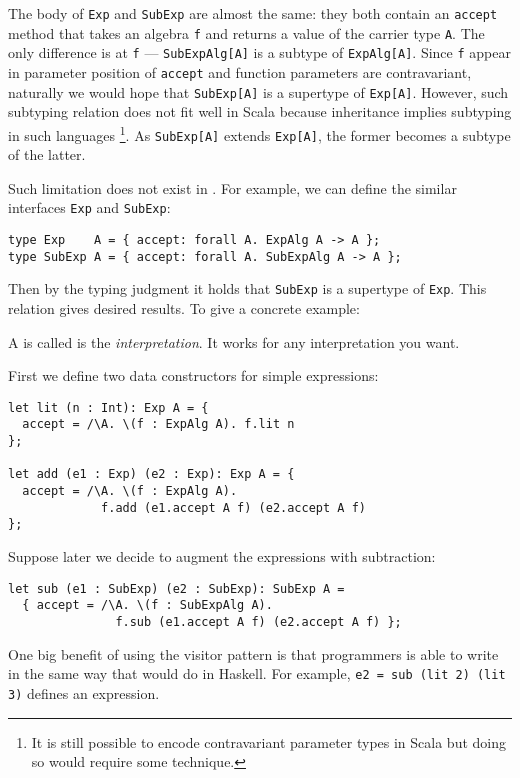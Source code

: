 The body of \lstinline{Exp} and \lstinline{SubExp} are almost the same: they
both contain an \lstinline{accept} method that takes an algebra \lstinline{f}
and returns a value of the carrier type \lstinline{A}. The only difference is at
\lstinline{f} --- \lstinline{SubExpAlg[A]} is a subtype of
\lstinline{ExpAlg[A]}. Since \lstinline{f} appear in parameter position of
\lstinline{accept} and function parameters are contravariant, naturally we would
hope that \lstinline{SubExp[A]} is a supertype of \lstinline{Exp[A]}. However,
such subtyping relation does not fit well in Scala because inheritance implies
subtyping in such languages \footnote{It is still possible to encode
  contravariant parameter types in Scala but doing so would require some
  technique.}. As \lstinline{SubExp[A]} extends \lstinline{Exp[A]}, the former
becomes a subtype of the latter.

Such limitation does not exist in \name. For example, we can define the similar interfaces \lstinline{Exp} and \lstinline{SubExp}:
\begin{lstlisting}
type Exp    A = { accept: forall A. ExpAlg A -> A };
type SubExp A = { accept: forall A. SubExpAlg A -> A };
\end{lstlisting}
Then by the typing judgment it holds that \lstinline{SubExp} is a supertype of
\lstinline{Exp}. This relation gives desired results. To give a concrete example:

A is called is the \emph{interpretation}. It works for any interpretation you want.

First we define two data constructors for simple expressions:
\begin{lstlisting}
let lit (n : Int): Exp A = {
  accept = /\A. \(f : ExpAlg A). f.lit n
};

let add (e1 : Exp) (e2 : Exp): Exp A = {
  accept = /\A. \(f : ExpAlg A).
             f.add (e1.accept A f) (e2.accept A f)
};
\end{lstlisting}

Suppose later we decide to augment the expressions with subtraction:
\begin{lstlisting}
let sub (e1 : SubExp) (e2 : SubExp): SubExp A =
  { accept = /\A. \(f : SubExpAlg A).
               f.sub (e1.accept A f) (e2.accept A f) };
\end{lstlisting}

One big benefit of using the visitor pattern is that programmers is able to
write in the same way that would do in Haskell.
For example, \lstinline{e2 = sub (lit 2) (lit 3)} defines an expression.

